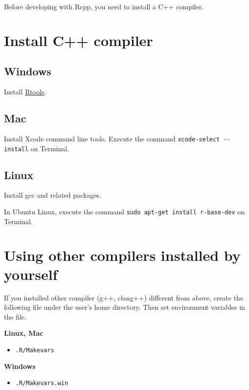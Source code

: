 \documentclass[]{book}
\providecommand{\tightlist}{%
  \setlength{\itemsep}{0pt}\setlength{\parskip}{0pt}}
\begin{document}
Before developing with Rcpp, you need to install a C++ compiler.

\hypertarget{install-c-compiler}{%
\section{Install C++ compiler}\label{install-c-compiler}}

\hypertarget{windows}{%
\subsection{Windows}\label{windows}}

Install \href{https://cran.r-project.org/bin/windows/Rtools/index.html}{Rtools}.

\hypertarget{mac}{%
\subsection{Mac}\label{mac}}

Install Xcode command line tools. Execute the command \texttt{xcode-select\ -\/-install} on Terminal.

\hypertarget{linux}{%
\subsection{Linux}\label{linux}}

Install gcc and related packages.

In Ubuntu Linux, execute the command \texttt{sudo\ apt-get\ install\ r-base-dev} on Terminal.

\hypertarget{using-other-compilers-installed-by-yourself}{%
\section{Using other compilers installed by yourself}\label{using-other-compilers-installed-by-yourself}}

If you installed other compiler (g++, clang++) different from above, create the following file under the user's home directory. Then set environment variables in the file.

\textbf{Linux, Mac}

\begin{itemize}
\tightlist
\item
  \texttt{.R/Makevars}
\end{itemize}

\textbf{Windows}

\begin{itemize}
\tightlist
\item
  \texttt{.R/Makevars.win}
\end{itemize}
\end{document}
